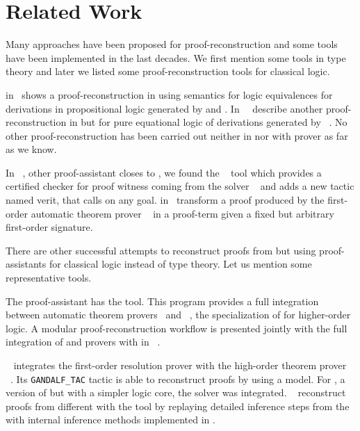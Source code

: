 \documentclass[../main.tex]{subfiles}
\begin{document}

\section{Related Work}
\label{sec:related-work}

Many approaches have been proposed for proof-reconstruction and some tools have
been implemented in the last decades. We first mention some tools in type
theory and later we listed some proof-reconstruction tools for classical logic.

\citeauthor{Kanso2012} in~\cite{Kanso2012,kanso2016light} shows a
proof-reconstruction in \Agda using semantics for logic equivalences for
derivations in propositional logic generated by  and . In
\cite{foster2011integrating}~\citeauthor{foster2011integrating}~describe another
proof-reconstruction in \Agda but for pure equational logic of derivations
generated by ~\cite{hillenbrand1997}. No other
proof-reconstruction has been carried out neither in \Agda nor with \Metis
prover as far as we know.

In ~\cite{coqteam}, other proof-assistant closes to \Agda, we found
the ~\cite{armand2011,Ekici2017} tool which provides a certified
checker for proof witness coming from the \SMT solver
~\cite{bouton2009} and adds a new tactic named verit, that calls
 on any  goal. \citeauthor{Bezem2002} in~\cite{Bezem2002}
transform a proof produced by the first-order automatic theorem prover
~\cite{deNivelle2003} in a  proof-term given a fixed but
arbitrary first-order signature.

There are other successful attempts to reconstruct proofs from \ATPs but
using proof-assistants for classical logic instead of type theory.
Let us mention some representative tools.

The  proof-assistant has the  tool.
This program provides a full integration between
automatic theorem provers~\cite{blanchette2013extending,Fleury2014,bohme2010} and
~\cite{nipkow2002isabelle}, the specialization of
 for higher-order logic.
A modular proof-reconstruction workflow is presented jointly with
the full integration of  and  provers with
 in \citeauthor{Een2004}~\cite{Een2004}.

\citeauthor{Hurd1999}~\cite{Hurd1999} integrates the first-order resolution
prover  with the high-order theorem prover
~\cite{norrish2017hol}.
Its \verb!GANDALF_TAC! tactic is able to reconstruct  proofs
by using a  model. For , a version of
 but with a simpler logic core, the \SMT solver 
was integrated. \citeauthor{kaliszyk2013}~\cite{kaliszyk2013}
reconstruct proofs from different \ATPs with the  tool by
replaying detailed inference steps from the \ATPs with internal
inference methods implemented in .
\end{document}
